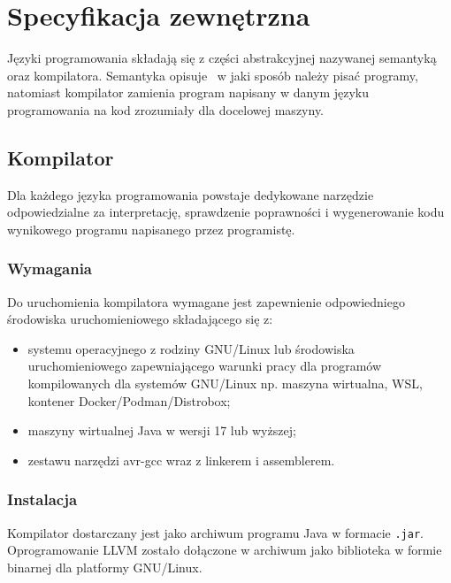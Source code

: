 \chapter{Specyfikacja zewnętrzna}
\label{ch:04}
Języki programowania składają się z części abstrakcyjnej nazywanej semantyką oraz kompilatora. Semantyka opisuje \comma\ w jaki sposób należy pisać programy, natomiast kompilator zamienia program napisany w danym języku programowania na kod zrozumiały dla docelowej maszyny. 
\section{Kompilator}
Dla każdego języka programowania powstaje dedykowane narzędzie odpowiedzialne za interpretację, sprawdzenie poprawności i wygenerowanie kodu wynikowego programu napisanego przez programistę.
\subsection{Wymagania}
Do uruchomienia kompilatora wymagane jest zapewnienie odpowiedniego środowiska uruchomieniowego składającego się z:
\begin{itemize}
\item systemu operacyjnego z rodziny GNU/Linux lub środowiska uruchomieniowego zapewniającego warunki pracy dla programów kompilowanych dla systemów GNU/Linux np. maszyna wirtualna, WSL, kontener Docker/Podman/Distrobox;
\item maszyny wirtualnej Java w wersji 17 lub wyższej;
\item zestawu narzędzi avr-gcc wraz z linkerem i assemblerem.
\end{itemize}

\subsection{Instalacja}
Kompilator dostarczany jest jako archiwum programu Java w formacie \lstinline|.jar|. Oprogramowanie LLVM zostało dołączone w archiwum jako biblioteka w formie binarnej dla platformy GNU/Linux.


